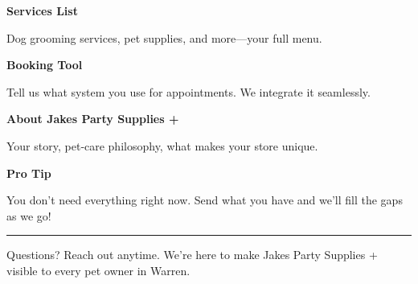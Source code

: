 \documentclass[11pt,letterpaper]{article}
\begin{document}
\hfill
\begin{minipage}[t]{0.48\textwidth}
\begin{tcolorbox}[colframe=accent-teal, boxrule=1pt, left=0.7em, right=0.7em, top=0.5em, bottom=0.5em, arc=4pt, boxsep=0pt]
{\bfseries\small\color{accent-teal}Services List}

\vspace{0.15em}

{\small Dog grooming services, pet supplies, and more—your full menu.}
\end{tcolorbox}

\vspace{0.1em}

\begin{tcolorbox}[colframe=accent-teal, boxrule=1pt, left=0.7em, right=0.7em, top=0.5em, bottom=0.5em, arc=4pt, boxsep=0pt]
{\bfseries\small\color{accent-teal}Booking Tool}

\vspace{0.15em}

{\small Tell us what system you use for appointments. We integrate it seamlessly.}
\end{tcolorbox}

\vspace{0.1em}

\begin{tcolorbox}[colframe=accent-teal, boxrule=1pt, left=0.7em, right=0.7em, top=0.5em, bottom=0.5em, arc=4pt, boxsep=0pt]
{\bfseries\small\color{accent-teal}About Jakes Party Supplies +}

\vspace{0.15em}

{\small Your story, pet‑care philosophy, what makes your store unique.}
\end{tcolorbox}

\vspace{-0.2em}
\end{minipage}

\vspace{0.15em}

\begin{tcolorbox}[colback={accent-red!5}, colframe=accent-red!20, boxrule=0.5pt, left=0.7em, right=0.7em, top=0.4em, bottom=0.4em, arc=6pt, boxsep=0pt]

{\bfseries\small\color{accent-red}Pro Tip}

\vspace{0.1em}

{\small You don't need everything right now. Send what you have and we'll fill the gaps as we go!}

\end{tcolorbox}

\vspace{0.15em}

\noindent\hrule
\vspace{0.2em}

{\small\color{text-light}Questions? Reach out anytime. We're here to make Jakes Party Supplies + visible to every pet owner in Warren.}
\end{document}

